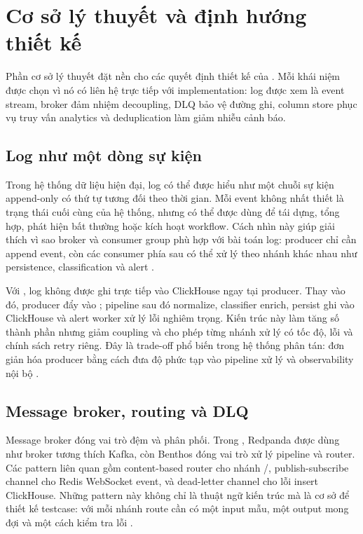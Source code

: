 \section{Cơ sở lý thuyết và định hướng thiết kế}

Phần cơ sở lý thuyết đặt nền cho các quyết định thiết kế của \LogRider{}. Mỗi khái niệm được chọn vì nó có liên hệ trực tiếp với implementation: log được xem là event stream, broker đảm nhiệm decoupling, DLQ bảo vệ đường ghi, column store phục vụ truy vấn analytics và deduplication làm giảm nhiễu cảnh báo.

\subsection{Log như một dòng sự kiện}

Trong hệ thống dữ liệu hiện đại, log có thể được hiểu như một chuỗi sự kiện append-only có thứ tự tương đối theo thời gian. Mỗi event không nhất thiết là trạng thái cuối cùng của hệ thống, nhưng có thể được dùng để tái dựng, tổng hợp, phát hiện bất thường hoặc kích hoạt workflow. Cách nhìn này giúp giải thích vì sao broker và consumer group phù hợp với bài toán log: producer chỉ cần append event, còn các consumer phía sau có thể xử lý theo nhánh khác nhau như persistence, classification và alert \cite{krepsLog,kleppmann2017}.

Với \LogRider{}, log không được ghi trực tiếp vào ClickHouse ngay tại producer. Thay vào đó, producer đẩy vào ; pipeline sau đó normalize, classifier enrich, persist ghi vào ClickHouse và alert worker xử lý lỗi nghiêm trọng. Kiến trúc này làm tăng số thành phần nhưng giảm coupling và cho phép từng nhánh xử lý có tốc độ, lỗi và chính sách retry riêng. Đây là trade-off phổ biến trong hệ thống phân tán: đơn giản hóa producer bằng cách đưa độ phức tạp vào pipeline xử lý và observability nội bộ \cite{eip2003,narkhede2017}.

\subsection{Message broker, routing và DLQ}

Message broker đóng vai trò đệm và phân phối. Trong \LogRider{}, Redpanda được dùng như broker tương thích Kafka, còn Benthos đóng vai trò xử lý pipeline và router. Các pattern liên quan gồm content-based router cho nhánh /, publish-subscribe channel cho Redis WebSocket event, và dead-letter channel cho lỗi insert ClickHouse. Những pattern này không chỉ là thuật ngữ kiến trúc mà là cơ sở để thiết kế testcase: với mỗi nhánh route cần có một input mẫu, một output mong đợi và một cách kiểm tra lỗi \cite{eip2003}.

